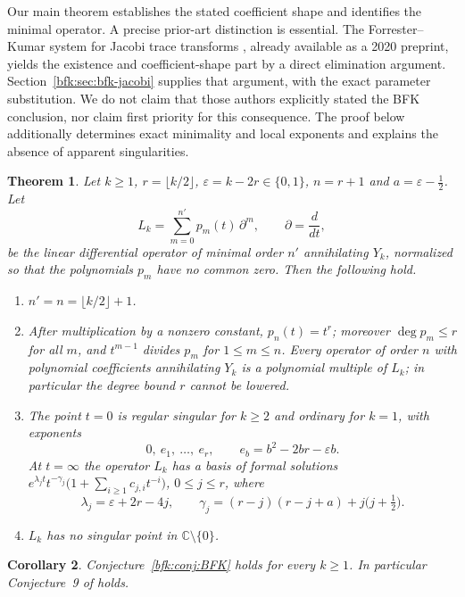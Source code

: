 \documentclass[11pt,a4paper]{article}
\newtheorem{theorem}{Theorem}[section]
\newtheorem{corollary}[theorem]{Corollary}
\theoremstyle{definition}
\theoremstyle{remark}
\numberwithin{equation}{section}
\newcommand{\C}{\mathbb{C}}
\newcommand{\fl}[1]{\lfloor #1\rfloor}
\begin{document}
Our main theorem establishes the stated coefficient shape and identifies the
minimal operator. A precise prior-art distinction is essential. The
Forrester--Kumar system for Jacobi trace transforms \cite{FK22}, already
available as a 2020 preprint, yields the existence and coefficient-shape part
by a direct elimination argument. Section~\ref{bfk:sec:bfk-jacobi} supplies that
argument, with the exact parameter substitution. We do not claim that those
authors explicitly stated the BFK conclusion, nor claim first priority for
this consequence. The proof below additionally determines exact minimality
and local exponents and explains the absence of apparent singularities.

\begin{theorem}\label{bfk:thm:main}
Let $k\ge 1$, $r=\fl{k/2}$, $\varepsilon=k-2r\in\{0,1\}$, $n=r+1$ and $a=\varepsilon-\tfrac12$. Let
\[
L_k=\sum_{m=0}^{n'}p_m(t)\,\partial^m,\qquad \partial=\frac{d}{dt},
\]
be the linear differential operator of minimal order $n'$ annihilating $Y_k$, normalized so that the polynomials $p_m$ have no common zero. Then the following hold.
\begin{enumerate}
\item[(i)] $n'=n=\fl{k/2}+1$.
\item[(ii)] After multiplication by a nonzero constant, $p_n(t)=t^{r}$; moreover $\deg p_m\le r$ for all $m$, and $t^{m-1}$ divides $p_m$ for $1\le m\le n$. Every operator of order $n$ with polynomial coefficients annihilating $Y_k$ is a polynomial multiple of $L_k$; in particular the degree bound $r$ cannot be lowered.
\item[(iii)] The point $t=0$ is regular singular for $k\ge2$ and ordinary for $k=1$, with exponents
\[
0,\ e_1,\ \dots,\ e_r,\qquad e_b=b^2-2br-\varepsilon b .
\]
At $t=\infty$ the operator $L_k$ has a basis of formal solutions $e^{\lambda_jt}t^{-\gamma_j}\bigl(1+\sum_{i\ge1}c_{j,i}t^{-i}\bigr)$, $0\le j\le r$, where
\[
\lambda_j=\varepsilon+2r-4j,\qquad \gamma_j=(r-j)(r-j+a)+j\bigl(j+\tfrac12\bigr).
\]
\item[(iv)] $L_k$ has no singular point in $\C\setminus\{0\}$.
\end{enumerate}
\end{theorem}

\begin{corollary}\label{bfk:cor:BFK}
Conjecture~\ref{bfk:conj:BFK} holds for every $k\ge 1$. In particular Conjecture~9 of \cite{Mis19} holds.
\end{corollary}
\end{document}
